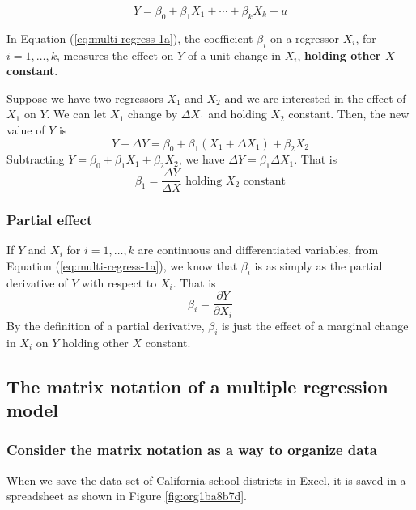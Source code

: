 \documentclass[a4paper,11pt]{article}
\begin{document}
\begin{equation}
\label{eq:multi-regress-1a}
Y = \beta_0 + \beta_1 X_1 + \cdots + \beta_k X_k + u
\end{equation}

In Equation (\ref{eq:multi-regress-1a}), the coefficient \(\beta_i\) on
a regressor \(X_i\), for \(i=1, \ldots, k\), measures the effect on \(Y\) of a
unit change in \(X_i\), \textbf{holding other \(X\) constant}. 

Suppose we have two regressors \(X_1\) and \(X_2\) and we are interested
in the effect of \(X_1\) on \(Y\). We can let \(X_1\) change by \(\Delta X_1\)
and holding \(X_2\) constant. Then, the new value of \(Y\) is
\[ 
Y + \Delta Y = \beta_0 + \beta_1 (X_1 + \Delta X_1) + \beta_2 X_2  
\]
Subtracting \(Y = \beta_0 + \beta_1 X_1 + \beta_2 X_2\), we have
\(\Delta Y = \beta_1 \Delta X_1\). That is
\[ \beta_1 = \frac{\Delta Y}{\Delta X} \text{ holding } X_2 \text{ constant} \]

\subsubsection*{Partial effect}
\label{sec:orgfb3725d}

If \(Y\) and \(X_i\) for \(i = 1, \ldots, k\) are continuous and
differentiated variables, from Equation (\ref{eq:multi-regress-1a}),
we know that \(\beta_i\) is as simply as the partial derivative of \(Y\) with
respect to \(X_i\). That is \[\beta_i = \frac{\partial Y}{\partial
X_i}\] By the definition of a partial derivative, \(\beta_i\) is just
the effect of a marginal change in \(X_i\) on \(Y\) holding other \(X\)
constant.


\subsection{The matrix notation of a multiple regression model}
\label{sec:org1aec0a0}

\subsubsection*{Consider the matrix notation as a way to organize data}
\label{sec:org2e2d92b}

When we save the data set of California school districts in Excel, it
is saved in a spreadsheet as shown in Figure \ref{fig:org1ba8b7d}.
\end{document}
